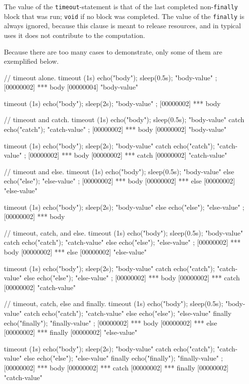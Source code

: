 The value of the \lstinline|timeout|-statement is that of the last
completed non-\lstinline|finally| block that was run; \lstinline|void| if
no block was completed.  The value of the \lstinline|finally| is always
ignored, because this clause is meant to release resources, and in typical
uses it does not contribute to the computation.

Because there are too many cases to demonstrate, only some of them are
exemplified below.
\begin{urbiscript}
// timeout alone.
timeout (1s)  { echo("body"); sleep(0.5s); "body-value" };
[00000002] *** body
[00000004] "body-value"

timeout (1s)  { echo("body"); sleep(2s); "body-value" };
[00000002] *** body

// timeout and catch.
timeout (1s)  { echo("body"); sleep(0.5s); "body-value" }
catch         { echo("catch"); "catch-value" };
[00000002] *** body
[00000002] "body-value"

timeout (1s)  { echo("body"); sleep(2s); "body-value" }
catch         { echo("catch"); "catch-value" };
[00000002] *** body
[00000002] *** catch
[00000002] "catch-value"

// timeout and else.
timeout (1s)  { echo("body"); sleep(0.5s); "body-value" }
else          { echo("else"); "else-value" };
[00000002] *** body
[00000002] *** else
[00000002] "else-value"

timeout (1s)  { echo("body"); sleep(2s); "body-value" }
else          { echo("else"); "else-value" };
[00000002] *** body

// timeout, catch, and else.
timeout (1s)  { echo("body"); sleep(0.5s); "body-value" }
catch         { echo("catch"); "catch-value" }
else          { echo("else"); "else-value" };
[00000002] *** body
[00000002] *** else
[00000002] "else-value"

timeout (1s)  { echo("body"); sleep(2s); "body-value" }
catch         { echo("catch"); "catch-value" }
else          { echo("else"); "else-value" };
[00000002] *** body
[00000002] *** catch
[00000002] "catch-value"

// timeout, catch, else and finally.
timeout (1s)  { echo("body"); sleep(0.5s); "body-value" }
catch         { echo("catch"); "catch-value" }
else          { echo("else"); "else-value" }
finally       { echo("finally"); "finally-value" };
[00000002] *** body
[00000002] *** else
[00000002] *** finally
[00000002] "else-value"

timeout (1s)  { echo("body"); sleep(2s); "body-value" }
catch         { echo("catch"); "catch-value" }
else          { echo("else"); "else-value" }
finally       { echo("finally"); "finally-value" };
[00000002] *** body
[00000002] *** catch
[00000002] *** finally
[00000002] "catch-value"
\end{urbiscript}

